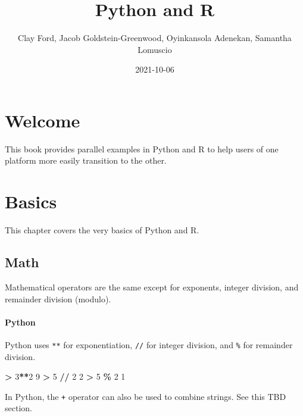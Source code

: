 \documentclass[
]{book}
\title{Python and R}
\author{Clay Ford, Jacob Goldstein-Greenwood, Oyinkansola Adenekan, Samantha Lomuscio}
\date{2021-10-06}
\newenvironment{Shaded}{\begin{snugshade}}{\end{snugshade}}
\newcommand{\DecValTok}[1]{\textcolor[rgb]{0.00,0.00,0.81}{#1}}
\newcommand{\OperatorTok}[1]{\textcolor[rgb]{0.81,0.36,0.00}{\textbf{#1}}}
\begin{document}
\maketitle

{
\setcounter{tocdepth}{1}
\tableofcontents
}
\hypertarget{welcome}{%
\chapter*{Welcome}\label{welcome}}

This book provides parallel examples in Python and R to help users of one platform more easily transition to the other.

\hypertarget{basics}{%
\chapter{Basics}\label{basics}}

This chapter covers the very basics of Python and R.

\hypertarget{math}{%
\section{Math}\label{math}}

Mathematical operators are the same except for exponents, integer division, and remainder division (modulo).

\hypertarget{python}{%
\subsubsection*{Python}\label{python}}

Python uses \texttt{**} for exponentiation, \texttt{//} for integer division, and \texttt{\%} for remainder division.

\begin{Shaded}
\begin{Highlighting}[]
\OperatorTok{\textgreater{}} \DecValTok{3}\OperatorTok{**}\DecValTok{2}
\DecValTok{9}
\OperatorTok{\textgreater{}} \DecValTok{5} \OperatorTok{//} \DecValTok{2}
\DecValTok{2}
\OperatorTok{\textgreater{}} \DecValTok{5} \OperatorTok{\%} \DecValTok{2}
\DecValTok{1}
\end{Highlighting}
\end{Shaded}

In Python, the \texttt{+} operator can also be used to combine strings. See this TBD section.
\end{document}
